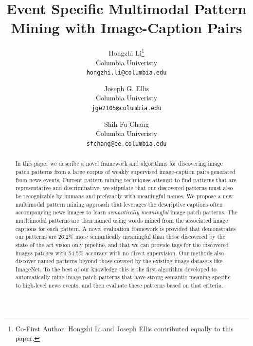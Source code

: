 \documentclass[10pt,twocolumn,letterpaper]{article}
\begin{document}
\title{Event Specific Multimodal Pattern Mining with Image-Caption Pairs}

\author{Hongzhi Li\thanks{Co-First Author. Hongzhi Li and Joseph Ellis contributed equally to this paper.}\\
Columbia Univeristy\\
{\tt\small hongzhi.li@columbia.edu}
\and
Joseph G. Ellis\footnotemark[1]\\
Columbia Univeristy \\
{\tt\small jge2105@columbia.edu}
\and
Shih-Fu Chang\\
Columbia Univeristy\\
{\tt\small sfchang@ee.columbia.edu}
}
\maketitle

\begin{abstract}
In this paper we describe a novel framework and algorithms for discovering image patch patterns from a large corpus of weakly supervised image-caption pairs generated from news events.
Current pattern mining techniques attempt to find patterns that are representative and discriminative, we stipulate that our discovered patterns must also be recognizable by humans and preferably with meaningful names.
We propose a new multimodal pattern mining approach that leverages the descriptive captions often accompanying news images to learn {\it semantically meaningful} image patch patterns.
The mutltimodal patterns are then named using words mined from the associated image captions for each pattern.
A novel evaluation framework is provided that demonstrates our patterns are 26.2\% more semantically meaningful than those discovered by the state of the art vision only pipeline, and that we can provide tags for the discovered images patches with 54.5\% accuracy with no direct supervision.
Our methods also discover named patterns beyond those covered by the existing image datasets like ImageNet.
To the best of our knowledge this is the first algorithm developed to automatically mine image patch patterns that have strong semantic meaning specific to high-level news events, and then evaluate these patterns based on that criteria.
\end{abstract}
\end{document}
